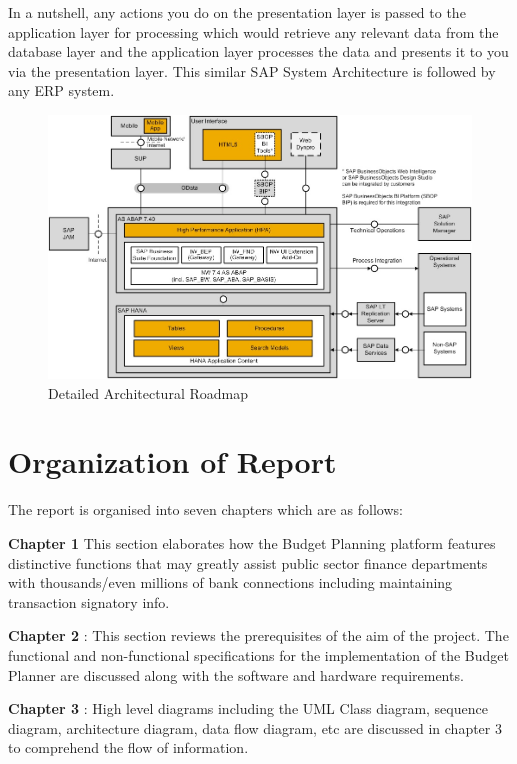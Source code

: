 In a nutshell, any actions you do on the presentation layer is passed to the application layer for processing which would retrieve any relevant data from the database layer and the application layer processes the data and presents it to you via the presentation layer. This similar SAP System Architecture is followed by any ERP system.

\begin{figure}[H]
    \centering
        \includegraphics[scale=0.5]{Chapter1/Figures/arch1.jpeg}
        \caption{Detailed Architectural Roadmap}
        \label{fig:architectural_detail}
\end{figure}


\section{Organization of Report}
The report is organised into seven chapters which are as follows:

{\bf Chapter 1} This section elaborates how the Budget Planning platform features distinctive functions
that may greatly assist public sector finance departments with thousands/even millions of
bank connections including maintaining transaction signatory info.

{\bf Chapter 2} : This section reviews the prerequisites of the aim of the project. The functional
and non-functional specifications for the implementation of the Budget Planner are discussed along
with the software and hardware requirements.

{\bf Chapter 3} : High level diagrams including the UML Class diagram, sequence diagram,
architecture diagram, data flow diagram, etc are discussed in chapter 3 to comprehend the
flow of information.

